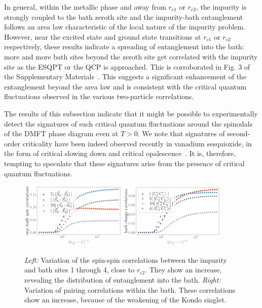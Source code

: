\documentclass{iopart}
\begin{document}
In general, within the metallic phase and away from \(r_{c1}\) or \(r_{c2}\), the impurity is strongly coupled to the bath zeroth site and the impurity-bath entanglement follows an area law characteristic of the local nature of the impurity problem. However, near the excited state and ground state transitions at \(r_{c1}\) or \(r_{c2}\) respectively, these results indicate a spreading of entanglement into the bath: more and more bath sites beyond the zeroth site get correlated with the impurity site as the ESQPT or the QCP is approached. This is corroborated in Fig. 3 of the Supplementary Materials~\cite{supp_mat}.
This suggests a significant enhancement of the entanglement beyond the area law and is consistent with the critical quantum fluctuations observed in the various two-particle correlations. 

The results of this subsection indicate that it might be possible to experimentally detect the signatures of such critical quantum fluctuations around the spinodals of the DMFT phase diagram even at \(T > 0\). We note that signatures of second-order criticality have been indeed observed recently in vanadium sesquioxide, in the form of critical slowing down and critical opalescence~\cite{satyaki_2020_PRL}. It is, therefore, tempting to speculate that these signatures arise from the presence of critical quantum fluctuations.

\begin{figure}[htpb]
	\includegraphics[width=0.45\textwidth]{rc2-spinspin-corr-di.pdf}
	\hspace*{\fill}
	\includegraphics[width=0.45\textwidth]{rc2-charge-flip-corr-0i.pdf}
	\caption{{\it Left:} Variation of the spin-spin correlations between the impurity and bath sites 1 through 4, close to \(r_{c2}\). They show an increase, revealing the distribution of entanglement into the bath. {\it Right:} Variation of pairing correlations within the bath. These correlations show an increase, because of the weakening of the Kondo singlet.}
	\label{Uc2-ss}
\end{figure}
\end{document}
